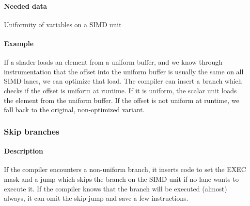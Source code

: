\paragraph{Needed data} Uniformity of variables on a SIMD unit
\paragraph{Example} If a shader loads an element from a uniform buffer, and we know through instrumentation that the offset into the uniform buffer is usually the same on all SIMD lanes, we can optimize that load.
The compiler can insert a branch which checks if the offset is uniform at runtime. If it is uniform, the scalar unit loads the element from the uniform buffer.
If the offset is not uniform at runtime, we fall back to the original, non-optimized variant.

\subsubsection{Skip branches}
\paragraph{Description} If the compiler encounters a non-uniform branch, it inserts code to set the EXEC mask and a jump which skips the branch on the SIMD unit if no lane wants to execute it. If the compiler knows that the branch will be executed (almost) always, it can omit the skip-jump and save a few instructions.
